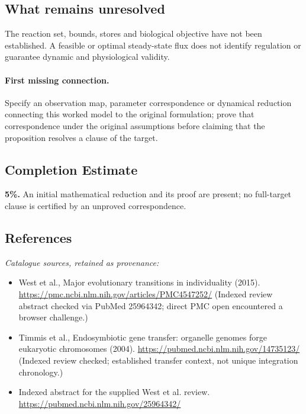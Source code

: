 \documentclass[11pt]{article}
\begin{document}
\subsection{What remains unresolved}
The reaction set, bounds, stores and biological objective have not been established. A feasible or optimal steady-state flux does not identify regulation or guarantee dynamic and physiological validity.
\paragraph{First missing connection.} Specify an observation map, parameter correspondence or dynamical reduction connecting this worked model to the original formulation; prove that correspondence under the original assumptions before claiming that the proposition resolves a clause of the target.
\subsection{Completion Estimate}
\textbf{5\%.} An initial mathematical reduction and its proof are present; no full-target clause is certified by an unproved correspondence.
\subsection{References}
\noindent\emph{Catalogue sources, retained as provenance:}
\begin{itemize}
\item West et al., Major evolutionary transitions in individuality (2015). \url{https://pmc.ncbi.nlm.nih.gov/articles/PMC4547252/} (Indexed review abstract checked via PubMed 25964342; direct PMC open encountered a browser challenge.)
\item Timmis et al., Endosymbiotic gene transfer: organelle genomes forge eukaryotic chromosomes (2004). \url{https://pubmed.ncbi.nlm.nih.gov/14735123/} (Indexed review checked; established transfer context, not unique integration chronology.)
\item Indexed abstract for the supplied West et al. review. \url{https://pubmed.ncbi.nlm.nih.gov/25964342/}
\end{itemize}
\clearpage


\appendix
\end{document}

